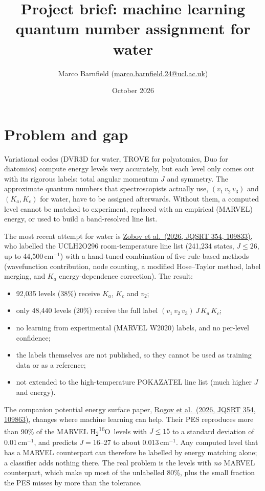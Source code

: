 \documentclass[11pt,a4paper]{article}
\title{Project brief: machine learning quantum number assignment for water}
\author{Marco Barnfield (\href{mailto:marco.barnfield.24@ucl.ac.uk}{marco.barnfield.24@ucl.ac.uk})}
\date{October 2026}
\newcommand{\water}{H\textsubscript{2}\textsuperscript{16}O}
\newcommand{\doi}[2]{\href{https://doi.org/#1}{#2}}
\begin{document}
\maketitle

\section{Problem and gap}

Variational codes (DVR3D for water, TROVE for polyatomics, Duo for diatomics) compute energy levels very accurately, but each level only comes out with its rigorous labels: total angular momentum $J$ and symmetry. The approximate quantum numbers that spectroscopists actually use, $(v_1\,v_2\,v_3)$ and $(K_a, K_c)$ for water, have to be assigned afterwards. Without them, a computed level cannot be matched to experiment, replaced with an empirical (MARVEL) energy, or used to build a band-resolved line list.

The most recent attempt for water is \doi{10.1016/j.jqsrt.2026.109833}{Zobov et al.\ (2026, JQSRT 354, 109833)}, who labelled the UCLH2O296 room-temperature line list (241,234 states, $J \le 26$, up to 44,500\,cm$^{-1}$) with a hand-tuned combination of five rule-based methods (wavefunction contribution, node counting, a modified Hose--Taylor method, label merging, and $K_a$ energy-dependence correction). The result:
\begin{itemize}
  \item 92,035 levels (38\%) receive $K_a$, $K_c$ and $v_2$;
  \item only 48,440 levels (20\%) receive the full label $(v_1\,v_2\,v_3)\,J\,K_a\,K_c$;
  \item no learning from experimental (MARVEL W2020) labels, and no per-level confidence;
  \item the labels themselves are not published, so they cannot be used as training data or as a reference;
  \item not extended to the high-temperature POKAZATEL line list (much higher $J$ and energy).
\end{itemize}
The companion potential energy surface paper, \doi{10.1016/j.jqsrt.2026.109863}{Rogov et al.\ (2026, JQSRT 354, 109863)}, changes where machine learning can help. Their PES reproduces more than 90\% of the MARVEL \water\ levels with $J \le 15$ to a standard deviation of 0.01\,cm$^{-1}$, and predicts $J = 16$--27 to about 0.013\,cm$^{-1}$. Any computed level that has a MARVEL counterpart can therefore be labelled by energy matching alone; a classifier adds nothing there. The real problem is the levels with \emph{no} MARVEL counterpart, which make up most of the unlabelled 80\%, plus the small fraction the PES misses by more than the tolerance.
\end{document}
